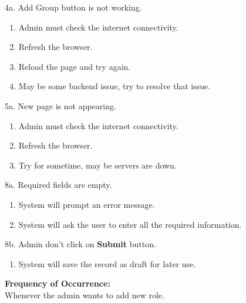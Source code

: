 \documentclass[12pt]{article}
\begin{document}
4a. Add Group button is not working.
\begin{enumerate}
\item Admin must check the internet connectivity.
\item Refresh the browser.
\item Reload the page and try again.
\item May be some backend issue, try to resolve that issue.
\end{enumerate}
5a. New page is not appearing.
\begin{enumerate}
\item Admin must check the internet connectivity.
\item Refresh the browser.
\item Try for sometime, may be servers are down.
\end{enumerate}
8a. Required fields are empty.
\begin{enumerate}
\item System will prompt an error message.
\item System will ask the user to enter all the required information.
\end{enumerate}
8b. Admin don't click on \textbf{Submit} button.
\begin{enumerate}
\item System will save the record as draft for later use.
\end{enumerate}
\textbf{Frequency of Occurrence:}\\
Whenever the admin wants to add new role.
\end{document}
